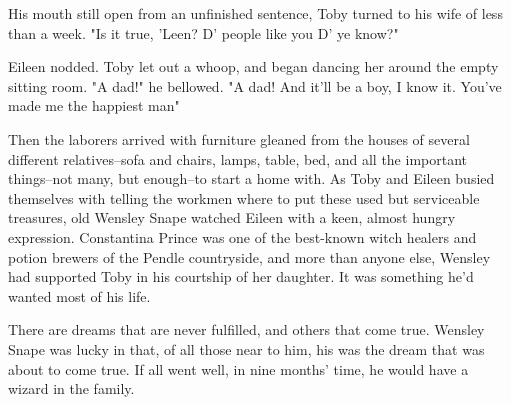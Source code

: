 His mouth still open from an unfinished sentence, Toby turned to his wife of less than a week. "Is it true, 'Leen? D' people like you{\el} D' ye know?"

Eileen nodded. Toby let out a whoop, and began dancing her around the empty sitting room. "A dad!" he bellowed. "A dad! And it'll be a boy, I know it. You've made me the happiest man{\el}"

Then the laborers arrived with furniture gleaned from the houses of several different relatives–sofa and chairs, lamps, table, bed, and all the important things–not many, but enough–to start a home with. As Toby and Eileen busied themselves with telling the workmen where to put these used but serviceable treasures, old Wensley Snape watched Eileen with a keen, almost hungry expression. Constantina Prince was one of the best-known witch healers and potion brewers of the Pendle countryside, and more than anyone else, Wensley had supported Toby in his courtship of her daughter. It was something he'd wanted most of his life.

There are dreams that are never fulfilled, and others that come true. Wensley Snape was lucky in that, of all those near to him, his was the dream that was about to come true. If all went well, in nine months' time, he would have a wizard in the family.
